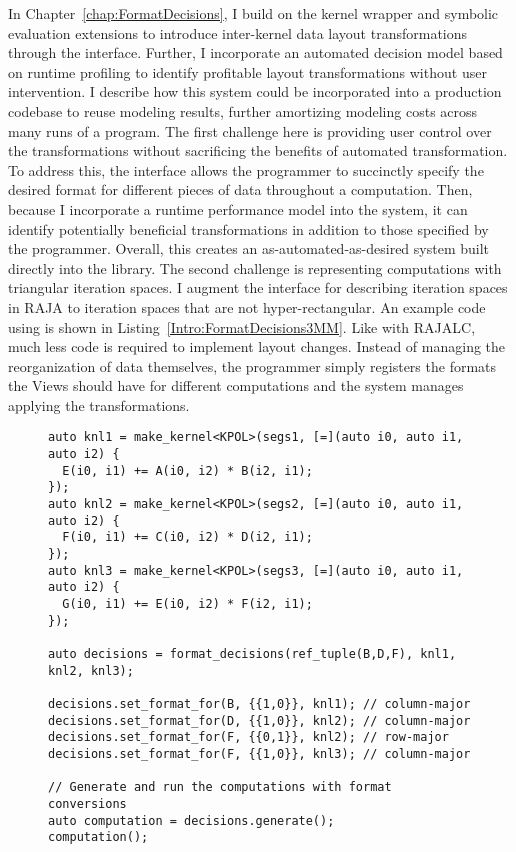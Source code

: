 In Chapter~\ref{chap:FormatDecisions}, I build on the kernel wrapper and symbolic evaluation extensions to introduce inter-kernel data layout transformations through the \FormatDecisions{} interface.
Further, I incorporate an automated decision model based on runtime profiling to identify profitable layout transformations without user intervention.
I describe how this system could be incorporated into a production codebase to reuse modeling results, further amortizing modeling costs across many runs of a program.
The first challenge here is providing user control over the transformations without sacrificing the benefits of automated transformation.
To address this, the interface allows the programmer to succinctly specify the desired format for different pieces of data throughout a computation.
Then, because I incorporate a runtime performance model into the system, it can identify potentially beneficial transformations in addition to those specified by the programmer.
Overall, this creates an as-automated-as-desired system built directly into the library.
The second challenge is representing computations with triangular iteration spaces.
I augment the interface for describing iteration spaces in RAJA to iteration spaces that are not hyper-rectangular.
An example code using \FormatDecisions{} is shown in Listing~\ref{Intro:FormatDecisions3MM}.
Like with RAJALC, much less code is required to implement layout changes.
Instead of managing the reorganization of data themselves, the programmer simply registers the formats the Views should have for different computations and the system manages applying the transformations.

\begin{figure}
\begin{lstlisting}[caption={Changing data layouts for three Views in the \textsc{3mm} benchmark using \FormatDecisions.},
  label={Intro:FormatDecisions3MM}]
auto knl1 = make_kernel<KPOL>(segs1, [=](auto i0, auto i1, auto i2) {
  E(i0, i1) += A(i0, i2) * B(i2, i1);
});
auto knl2 = make_kernel<KPOL>(segs2, [=](auto i0, auto i1, auto i2) {
  F(i0, i1) += C(i0, i2) * D(i2, i1);
});
auto knl3 = make_kernel<KPOL>(segs3, [=](auto i0, auto i1, auto i2) {
  G(i0, i1) += E(i0, i2) * F(i2, i1);
});

auto decisions = format_decisions(ref_tuple(B,D,F), knl1, knl2, knl3);

decisions.set_format_for(B, {{1,0}}, knl1); // column-major
decisions.set_format_for(D, {{1,0}}, knl2); // column-major
decisions.set_format_for(F, {{0,1}}, knl2); // row-major
decisions.set_format_for(F, {{1,0}}, knl3); // column-major

// Generate and run the computations with format conversions
auto computation = decisions.generate();
computation();
\end{lstlisting}
\end{figure}

